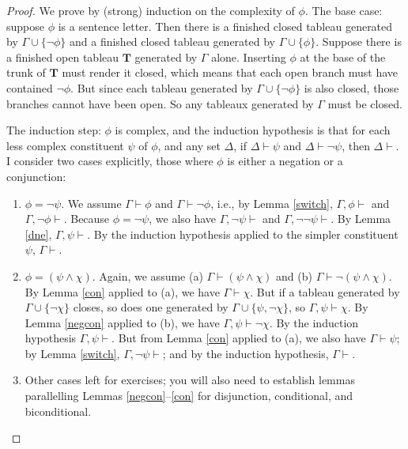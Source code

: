\begin{proof}
	We prove by (strong) induction on the complexity of $\phi$. The base case: suppose $\phi$ is a sentence letter. Then there is a finished closed tableau generated by $\Gamma \cup \{\neg\phi\}$ and a finished closed tableau generated by $\Gamma \cup \{\phi\}$. Suppose there is a finished open tableau $\mathbf{T}$ generated by $\Gamma$ alone. Inserting $\phi$ at the base of the trunk of $\mathbf{T}$ must render it closed, which means that each open branch must have contained $¬\phi$. But since each tableau generated by $\Gamma\cup\{¬\phi\}$ is also closed, those branches cannot have been open. So any tableaux generated by $\Gamma$ must be closed.
	
	The induction step: $\phi$ is complex, and the induction hypothesis is that for each less complex constituent $\psi$ of $\phi$, and any set $\Delta$, if $\Delta\vdash\psi$ and $\Delta\vdash\neg\psi$, then $\Delta \vdash$. I consider two cases explicitly, those where $\phi$ is either a negation or a conjunction: \begin{enumerate}
		\item $\phi = \neg\psi$. We assume $\Gamma \vdash \phi$ and $\Gamma \vdash \neg\phi$, i.e., by Lemma \ref{switch}, $\Gamma,\phi\vdash$ and $\Gamma,\neg\phi\vdash$. Because $\phi=\neg\psi$, we also have $\Gamma,\neg\psi\vdash$ and $\Gamma,\neg\neg\psi\vdash$. By Lemma \ref{dne}, $\Gamma,\psi \vdash$. By the induction hypothesis applied to the simpler constituent $\psi$, $\Gamma\vdash.$
	
\item $\phi = (\psi\wedge\chi)$. Again, we assume (a) $\Gamma \vdash (\psi\wedge\chi)$ and (b) $\Gamma \vdash \neg(\psi\wedge\chi)$. By Lemma \ref{con} applied to (a), we have $\Gamma\vdash\chi$. But if a tableau generated by $\Gamma\cup\{\neg\chi\}$ closes, so does one generated by $\Gamma\cup\{\psi,\neg\chi\}$, so $\Gamma,\psi\vdash\chi$. By Lemma \ref{negcon} applied to (b), we have $\Gamma,\psi\vdash\neg\chi$. By the induction hypothesis $\Gamma,\psi\vdash$. But from Lemma \ref{con} applied to (a), we also have $\Gamma\vdash\psi$; by Lemma \ref{switch}, $\Gamma,\neg\psi\vdash$; and by the induction hypothesis, $\Gamma\vdash$. 
\item Other cases left for exercises; you will also need to establish lemmas parallelling Lemmas \ref{negcon}–\ref{con} for disjunction, conditional, and biconditional. 
	\end{enumerate} 
\end{proof}

